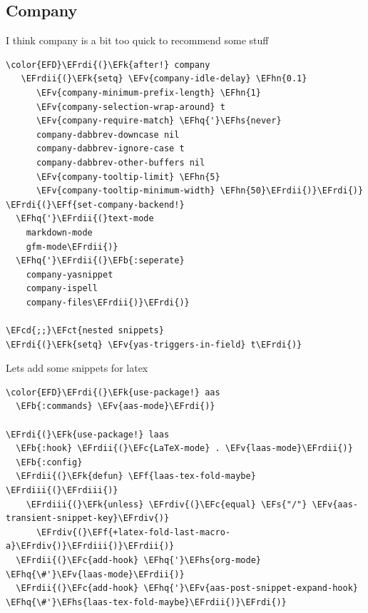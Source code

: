 \documentclass{scrartcl}
\newcommand{\EFk}[1]{\textcolor{EFk}{#1}} %
\newcommand{\EFs}[1]{\textcolor{EFs}{#1}} %
\newcommand{\EFb}[1]{\textcolor{EFb}{#1}} %
\newcommand{\EFct}[1]{\textcolor{EFct}{#1}} %
\newcommand{\EFc}[1]{\textcolor{EFc}{#1}} %
\newcommand{\EFv}[1]{\textcolor{EFv}{#1}} %
\newcommand{\EFf}[1]{\textcolor{EFf}{#1}} %
\newcommand{\EFcd}[1]{\textcolor{EFcd}{#1}} %
\newcommand{\EFhn}[1]{#1} %
\newcommand{\EFhq}[1]{#1} %
\newcommand{\EFhs}[1]{#1} %
\newcommand{\EFrdi}[1]{#1} %
\newcommand{\EFrdii}[1]{#1} %
\newcommand{\EFrdiii}[1]{#1} %
\newcommand{\EFrdiv}[1]{#1} %
\begin{document}
\subsection{Company}
\label{sec:orgf2c4aa1}
I think company is a bit too quick to recommend some stuff
\begin{Code}
\begin{Verbatim}[]
\color{EFD}\EFrdi{(}\EFk{after!} company
   \EFrdii{(}\EFk{setq} \EFv{company-idle-delay} \EFhn{0.1}
      \EFv{company-minimum-prefix-length} \EFhn{1}
      \EFv{company-selection-wrap-around} t
      \EFv{company-require-match} \EFhq{'}\EFhs{never}
      company-dabbrev-downcase nil
      company-dabbrev-ignore-case t
      company-dabbrev-other-buffers nil
      \EFv{company-tooltip-limit} \EFhn{5}
      \EFv{company-tooltip-minimum-width} \EFhn{50}\EFrdii{)}\EFrdi{)}
\EFrdi{(}\EFf{set-company-backend!}
  \EFhq{'}\EFrdii{(}text-mode
    markdown-mode
    gfm-mode\EFrdii{)}
  \EFhq{'}\EFrdii{(}\EFb{:seperate}
    company-yasnippet
    company-ispell
    company-files\EFrdii{)}\EFrdi{)}

\EFcd{;;}\EFct{nested snippets}
\EFrdi{(}\EFk{setq} \EFv{yas-triggers-in-field} t\EFrdi{)}
\end{Verbatim}
\end{Code}

Lets add some snippets for latex
\begin{Code}
\begin{Verbatim}[]
\color{EFD}\EFrdi{(}\EFk{use-package!} aas
  \EFb{:commands} \EFv{aas-mode}\EFrdi{)}

\EFrdi{(}\EFk{use-package!} laas
  \EFb{:hook} \EFrdii{(}\EFc{LaTeX-mode} . \EFv{laas-mode}\EFrdii{)}
  \EFb{:config}
  \EFrdii{(}\EFk{defun} \EFf{laas-tex-fold-maybe} \EFrdiii{(}\EFrdiii{)}
    \EFrdiii{(}\EFk{unless} \EFrdiv{(}\EFc{equal} \EFs{"/"} \EFv{aas-transient-snippet-key}\EFrdiv{)}
      \EFrdiv{(}\EFf{+latex-fold-last-macro-a}\EFrdiv{)}\EFrdiii{)}\EFrdii{)}
  \EFrdii{(}\EFc{add-hook} \EFhq{'}\EFhs{org-mode} \EFhq{\#'}\EFv{laas-mode}\EFrdii{)}
  \EFrdii{(}\EFc{add-hook} \EFhq{'}\EFv{aas-post-snippet-expand-hook} \EFhq{\#'}\EFhs{laas-tex-fold-maybe}\EFrdii{)}\EFrdi{)}

\end{Verbatim}
\end{Code}
\end{document}

